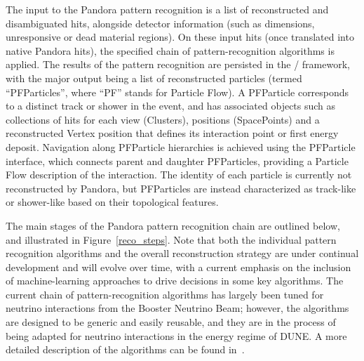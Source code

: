 

The input to the Pandora pattern recognition is a list of reconstructed and disambiguated \twod hits, alongside detector information (such as dimensions, unresponsive or dead material regions). On these input hits (once translated into native Pandora \twod hits), the specified chain of pattern-recognition algorithms is applied. The results of the pattern recognition are persisted in the / framework, with the major output being a list of reconstructed \threed particles (termed ``PFParticles'', where ``PF'' stands for Particle Flow). A PFParticle corresponds to a distinct track or shower in the event, and has associated objects such as collections of \twod hits for each view (Clusters), \threed positions (SpacePoints) and a reconstructed Vertex position that defines its interaction point or first energy deposit. Navigation along PFParticle hierarchies is achieved using the PFParticle interface, which connects parent and daughter PFParticles, providing a Particle Flow description of the interaction. The identity of each particle is currently not reconstructed by Pandora, but PFParticles are instead characterized as track-like or shower-like based on their topological features. 

The main stages of the Pandora pattern recognition chain are outlined below, and illustrated in Figure~\ref{reco_steps}. Note that both the individual pattern recognition algorithms and the overall reconstruction strategy are under continual development and will evolve over time, with a current emphasis %
on the inclusion of machine-learning approaches to drive decisions in some key algorithms. The current chain of pattern-recognition algorithms has largely been tuned for neutrino interactions from the \fnal Booster Neutrino Beam; however, the algorithms are designed to be generic and easily reusable, and they are in the process of being adapted for neutrino interactions in the energy regime of DUNE. A more detailed description of the algorithms can be found in~\cite{Acciarri:2017hat}. 


